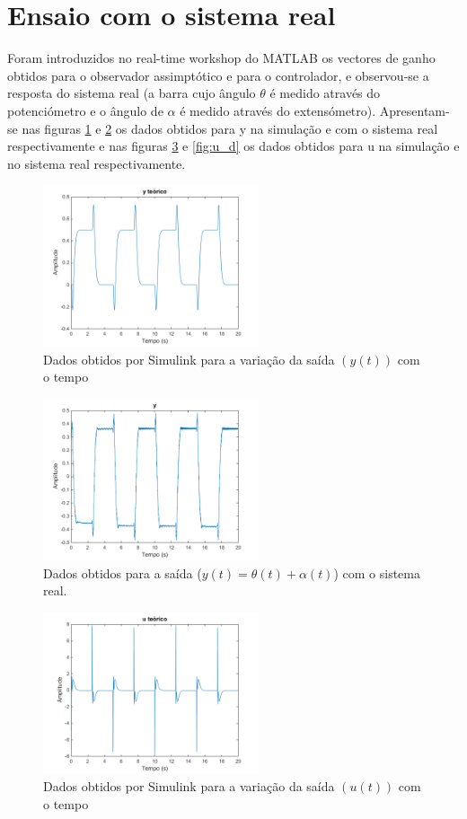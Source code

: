 \documentclass[%
  reprint,
  nofootinbib,
  amsmath,amssymb,
  aps,
  10pt,
  a4paper
]{revtex4-1}
\begin{document}
\section{Ensaio com o sistema real}
Foram introduzidos no real-time workshop do MATLAB os vectores de ganho obtidos para o observador assimptótico e para o controlador, e observou-se a resposta do sistema real (a barra cujo ângulo $\theta$ é medido através do potenciómetro e o ângulo de $\alpha$ é medido através do extensómetro). Apresentam-se nas figuras \ref{fig:y_t} e \ref{fig:y_d} os dados obtidos para y na simulação e com o sistema real respectivamente e nas figuras \ref{fig:u_t} e \ref{fig:u_d} os dados obtidos para u na simulação e no sistema real respectivamente.
\begin{figure}[H]
\includegraphics[width=2.5in]{../img/y.png}
\caption{Dados obtidos por Simulink para a variação da saída $(y(t))$ com o tempo}
\label{fig:y_t}
\end{figure}
\begin{figure}[H]
\includegraphics[width=2.5in]{../img/y_dados_01.png}
\caption{Dados obtidos para a saída ($y(t)=\theta(t)+\alpha(t)$) com o sistema real.}
\label{fig:y_d}
\end{figure}
\begin{figure}[H]
\includegraphics[width=2.5in]{../img/u.png}
\caption{Dados obtidos por Simulink para a variação da saída $(u(t))$ com o tempo}
\label{fig:u_t}
\end{figure}
\end{document}
